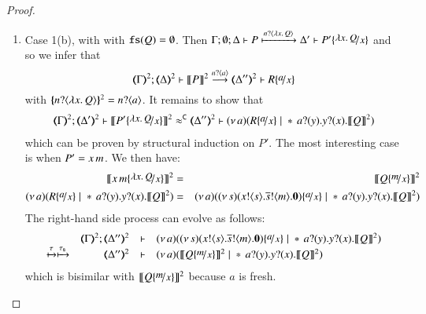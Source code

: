 \begin{proof}
\begin{enumerate}[1.]
	\item Case 1(b), with with $\mathtt{fs}(Q) =  \emptyset$. 
%
	Then
		$\Gamma; \es; \Delta \proves P \hby{\bactinp{n}{\abs{x}{Q}}} \Delta' \proves P' \subst{\abs{x}{Q}}{x}$
		and so we infer that
	\begin{equation*}
		\tmap{\Gamma}{2};  \tmap{\Delta}{2} \proves \pmap{P}{2} \by{\bactinp{n}{a}} \tmap{\Delta''}{2} \proves R \subst{a}{x}
	\end{equation*}
%
	\noi with $\{\!\!\{n ? \langle \lambda x.\,Q \rangle\}\!\!\}^{2} = n ? \langle a \rangle$.
%
	It remains to show that
%
	\begin{eqnarray*}
		\tmap{\Gamma}{2};  \tmap{\Delta'}{2} \proves \pmap{P' \subst{\abs{x}{Q}}{x}}{2} \fwb
		\tmap{\Delta''}{2} \proves \newsp{a}{R \subst{a}{x} \Par \repl{} \binp{a}{y} \binp{y}{x} \pmap{Q}{2}}
	\end{eqnarray*}
which can be proven by structural induction on $P'$.
The most interesting case is when $P' = x\, {m}$. We then have:
%
	\begin{eqnarray*}
		\pmap{\appl{x}{m} \subst{\abs{x}{Q}}{x}}{2} &=& \pmap{Q \subst{m}{x}}{2}\\
		\newsp{a}{R \subst{a}{x} \Par \repl{} \binp{a}{y} \binp{y}{x} \pmap{Q}{2}} &=& \newsp{a}{\newsp{s}{ \bout{x}{s} \bout{\dual{s}}{m} \inact} \subst{a}{x} \Par \repl{} \binp{a}{y} \binp{y}{x} \pmap{Q}{2}}
	\end{eqnarray*}
%
	\noi The right-hand side process can evolve as follows:
%
	\begin{eqnarray*}
		\mhorel{\tmap{\Gamma}{2}}{\tmap{\Delta''}{2}}{\newsp{a}{\newsp{s}{ \bout{x}{s} \bout{\dual{s}}{m} \inact} \subst{a}{x} \Par \repl{} \binp{a}{y} \binp{y}{x} \pmap{Q}{2}}}
		{\hby{\tau} \hby{\stau}}
		{\tmap{\Delta''}{2}}{}{\newsp{a}{\pmap{Q \subst{m}{x}}{2} \Par \repl{} \binp{a}{y} \binp{y}{x} \pmap{Q}{2}}}
	\end{eqnarray*}
%
	\noi which is bisimilar with		$\pmap{Q \subst{m}{x}}{2}$ because $a$ is fresh.


\end{enumerate}
\end{proof}
